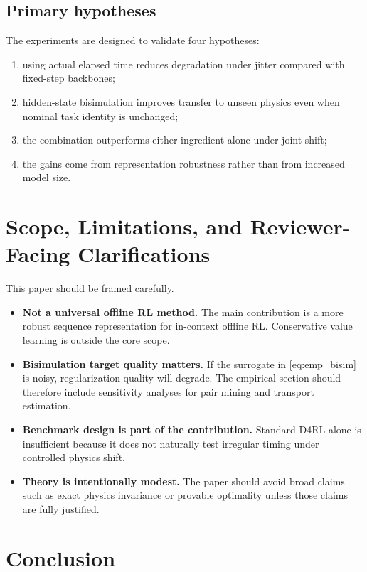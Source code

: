 \documentclass[11pt]{article}
\begin{document}
\subsection{Primary hypotheses}

The experiments are designed to validate four hypotheses:
\begin{enumerate}
    \item using actual elapsed time reduces degradation under jitter compared with fixed-step backbones;
    \item hidden-state bisimulation improves transfer to unseen physics even when nominal task identity is unchanged;
    \item the combination outperforms either ingredient alone under joint shift;
    \item the gains come from representation robustness rather than from increased model size.
\end{enumerate}

\section{Scope, Limitations, and Reviewer-Facing Clarifications}

This paper should be framed carefully.

\begin{itemize}
    \item \textbf{Not a universal offline RL method.} The main contribution is a more robust sequence representation for in-context offline RL. Conservative value learning is outside the core scope.
    \item \textbf{Bisimulation target quality matters.} If the surrogate in \cref{eq:emp_bisim} is noisy, regularization quality will degrade. The empirical section should therefore include sensitivity analyses for pair mining and transport estimation.
    \item \textbf{Benchmark design is part of the contribution.} Standard D4RL alone is insufficient because it does not naturally test irregular timing under controlled physics shift.
    \item \textbf{Theory is intentionally modest.} The paper should avoid broad claims such as exact physics invariance or provable optimality unless those claims are fully justified.
\end{itemize}

\section{Conclusion}
\end{document}
